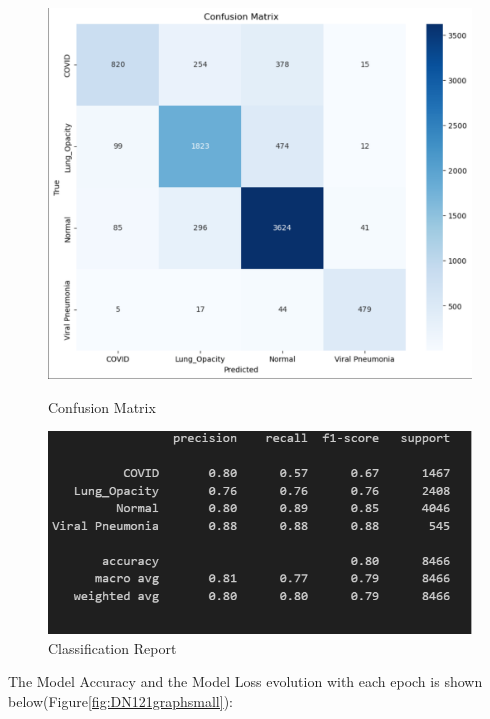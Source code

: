 \documentclass{article}
\begin{document}
\begin{figure}[H]
    \centering
    \begin{minipage}[t]{0.48\textwidth}
        \centering
        \includegraphics[width=\linewidth]{DN121cmsmall.png}
        \caption{Confusion Matrix}
        \label{fig:DN121cmsmall}
    \end{minipage}
    \hfill
    \begin{minipage}[t]{0.48\textwidth}
        \centering
        \includegraphics[width=\linewidth]{DN121crsmall.png}
        \caption{Classification Report}
        \label{fig:DN121crsmall}
    \end{minipage}
\end{figure}

The Model Accuracy and the Model Loss evolution with each epoch is shown below(Figure\ref{fig:DN121graphsmall}):
\end{document}
